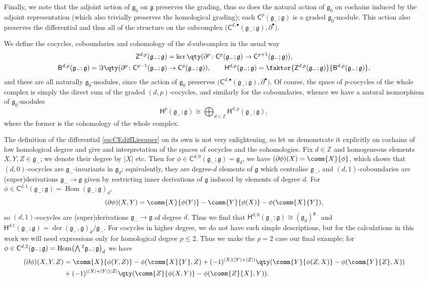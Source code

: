 \documentclass[pdftex]{sigma}
\numberwithin{equation}{section}
\newcommand{\fg}{\mathfrak{g}}
\newcommand{\ZZ}{\mathbb{Z}}
\newcommand{\ssB}{\mathsf{B}}
\newcommand{\ssC}{\mathsf{C}}
\newcommand{\ssH}{\mathsf{H}}
\newcommand{\ssZ}{\mathsf{Z}}
\newcommand{\Wedge}{\mathchoice{{\textstyle\bigwedge}}{\bigwedge}{\bigwedge}{\bigwedge}}	%
\newcommand{\1}{\mathbbm{1}}
\DeclareMathOperator{\Hom}{Hom}
\begin{document}
Finally, we note that the adjoint action of $\fg_0$ on $\fg$ preserves the grading, thus so does the natural action of $\fg_0$ on cochains induced by the adjoint representation (which also trivially preserves the homological grading); each $\ssC^p(\fg_-;\fg)$ is a graded $\fg_0$-module. This action also preserves the differential and thus all of the structure on the subcomplex $\bigl(\ssC^{d,\bullet}(\fg_-;\fg),\partial^\bullet\bigr)$.


We define the cocycles, coboundaries and cohomology of the $d$-subcomplex in the usual way
\begin{gather*}
	\ssZ^{d,p}(\fg_-;\fg) = \ker\qty(\partial^p\colon \ssC^p(\fg_-;\fg)\to \ssC^{p+1}(\fg_-;\fg)),	\\
	\ssB^{d,p}(\fg_-;\fg) = \Im\qty(\partial^p\colon \ssC^{p-1}(\fg_-;\fg)\to \ssC^{p}(\fg_-;\fg)),	\qquad
	\ssH^{d,p}(\fg_-;\fg) = \faktor{\ssZ^{d,p}(\fg_-;\fg)}{\ssB^{d,p}(\fg_-;\fg)},
\end{gather*}
and these are all naturally $\fg_0$-modules, since the action of $\fg_0$ preserves $\bigl(\ssC^{d,\bullet}(\fg_-;\fg),\partial^\bullet\bigr)$. Of course, the space of $p$-cocycles of the whole complex is simply the direct sum of the graded $(d,p)$-cocycles, and similarly for the coboundaries, whence we have a natural isomorphism of $\fg_0$-modules
\[
	\ssH^p(\fg_-;\fg) \cong \bigoplus_{d\in\ZZ}\ssH^{d,p}(\fg_-;\fg),
\]
where the former is the cohomology of the whole complex.

The definition of the differential \eqref{eq:CEdiffLiesuper} on its own is not very enlightening, so let us demonstrate it explicitly on cochains of low homological degree and give and interpretation of the spaces of cocycles and the cohomologies. Fix $d\in\ZZ$ and homogeneous elements $X,Y,Z\in\fg_-$; we denote their degree by $|X|$ etc. Then for $\phi\in\ssC^{d,0}(\fg_-;\fg)=\fg_d$, we have
$(\partial \phi)(X) = \comm{X}{\phi}$,
which shows that $(d,0)$-cocycles are $\fg_-$-invariants in $\fg_d$; equivalently, they are degree-$d$ elements of $\fg$ which centralise $\fg_-$, and $(d,1)$-coboundaries are (super)derivations $\fg_-\to\fg$ given by restricting inner derivations of $\fg$ induced by elements of degree $d$. For $\phi\in\ssC^{d,1}(\fg_-;\fg)=\Hom(\fg_-;\fg)_d$,
\[
	(\partial \phi)(X,Y) = \comm{X}{\phi(Y)} - \comm{Y}{\phi(X)} -\phi(\comm{X}{Y}),
\]
so $(d,1)$-cocycles are (super)derivations $\fg_-\to\fg$ of degree $d$. Thus we find that $\ssH^{d,0}(\fg_-;\fg) \cong (\fg_d)^{\fg_-}$ and $\ssH^{d.1}(\fg_-;\fg)=\operatorname{der}(\fg_-,\fg)_d/\fg_-$. For cocycles in higher degree, we do not have such simple descriptions, but for the calculations in this work we will need expressions only for homological degree $p\leq 2$. Thus we make the $p=2$ case our final example; for $\phi\in\ssC^{d,2}(\fg_-;\fg)=\Hom\bigl(\Wedge^2\fg_-;\fg\bigr)_d$ we have
\begin{align*}
	(\partial \phi)(X,Y,Z) &= \comm{X}{\phi(Y,Z)} - \phi(\comm{X}{Y},Z) + (-1)^{|X|(|Y|+|Z|)} \qty( \comm{Y}{\phi(Z,X)} - \phi(\comm{Y}{Z},X) )\\
		& + (-1)^{(|X|+|Y|)|Z|} \qty( \comm{Z}{\phi(X,Y)} - \phi(\comm{Z}{X},Y) ).
\end{align*}
\end{document}
